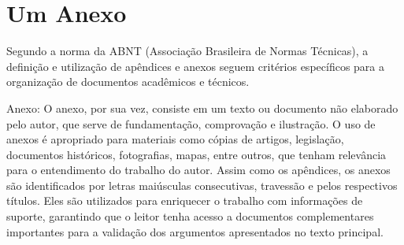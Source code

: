 
\chapter{Um Anexo}
    Segundo a norma da ABNT (Associação Brasileira de Normas Técnicas), a definição e utilização de apêndices e anexos seguem critérios específicos para a organização de documentos acadêmicos e técnicos.
    
    Anexo: O anexo, por sua vez, consiste em um texto ou documento não elaborado pelo autor, que serve de fundamentação, comprovação e ilustração. O uso de anexos é apropriado para materiais como cópias de artigos, legislação, documentos históricos, fotografias, mapas, entre outros, que tenham relevância para o entendimento do trabalho do autor. Assim como os apêndices, os anexos são identificados por letras maiúsculas consecutivas, travessão e pelos respectivos títulos. Eles são utilizados para enriquecer o trabalho com informações de suporte, garantindo que o leitor tenha acesso a documentos complementares importantes para a validação dos argumentos apresentados no texto principal.